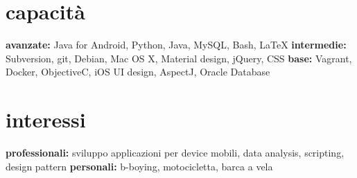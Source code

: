 \documentclass[print]{friggeri-custom} %
\begin{document}
\begin{entrylist}

\end{entrylist}


\section{capacità}

\textbf{avanzate:} Java for Android, Python, Java, MySQL, Bash, \LaTeX{} \textbf{intermedie:} Subversion, git, Debian, Mac OS X, Material design, jQuery, CSS \textbf{base:} Vagrant, Docker, ObjectiveC, iOS UI design, AspectJ, Oracle Database


\section{interessi}

\textbf{professionali:} sviluppo applicazioni per device mobili, data analysis, scripting, design pattern \textbf{personali:} b-boying, motocicletta, barca a vela
\end{document}
